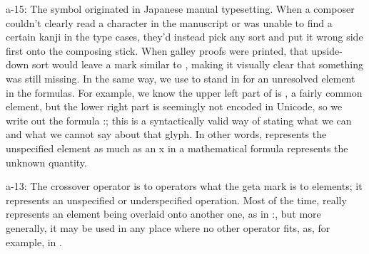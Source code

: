 \begin{multicols}{2}
{\mktsStyleBold{}a-15}: The symbol \cjkgGlue{} originated in Japanese manual typesetting. When a composer
couldn’t clearly read a character in the manuscript or was unable to find
a certain kanji in the type cases, they’d instead pick any sort and
put it wrong side first onto the composing stick. When galley proofs were
printed, that upside-down sort would leave a mark similar to \cjkgGlue{}, making it
visually clear that something was still missing. In the same way, we
use \cjkgGlue{} to stand in for an unresolved element in the formulas. For
example, we know the upper left part of \cjkgGlue{} is \cjkgGlue{}, a fairly common element,
but the lower right part is seemingly not encoded in Unicode, so we write
out the formula \cjkgGlue{}:\cjkgGlue{}\cjkgGlue{}; this is a syntactically valid way of stating what
we can and what we cannot say about that glyph. In other words,
\cjkgGlue{} represents the unspecified element as much as an {\mktsStyleItalic{}x\/} in a mathematical
formula represents the unknown quantity.

{\mktsStyleBold{}a-13}: The crossover operator \cjkgGlue{} is to operators what the geta mark
\cjkgGlue{} is to elements; it represents an unspecified or underspecified operation. Most of
the time, \cjkgGlue{} really represents an element being overlaid onto another
one, as in \cjkgGlue{}:\cjkgGlue{}\cjkgGlue{}, but more generally, it may be used in any place
where no other operator fits, as, for example, in \cjkgGlue{}.


\end{multicols}
